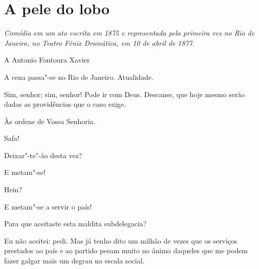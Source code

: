 \chapter{A pele do lobo}

\textit{Comédia em um ato escrita em 1875 e representada pela primeira vez no Rio de Janeiro, no
Teatro Fênix Dramática, em 10 de abril de 1877.}
\medskip

\hfill A Antonio Fontoura Xavier


\castpage










\vfil

A cena passa"-se no Rio de Janeiro.
Atualidade.
\pagebreak 



 

 Sim, senhor; sim, senhor! Pode ir com Deus. Descanse, que
hoje mesmo serão dadas as providências que o caso exige.

 Às ordens de Vossa Senhoria. 

 Safa!

   Deixar"-te"-ão desta vez?

 E metam"-se! 

  Hein?

 E metam"-se a servir o país!

 Para que aceitaste esta maldita subdelegacia?

  Eu não aceitei: pedi. Mas já tenho dito
um milhão de vezes que os serviços prestados ao país e ao partido pesam muito no
ânimo daqueles que me podem fazer galgar mais um degrau na
escala social.

